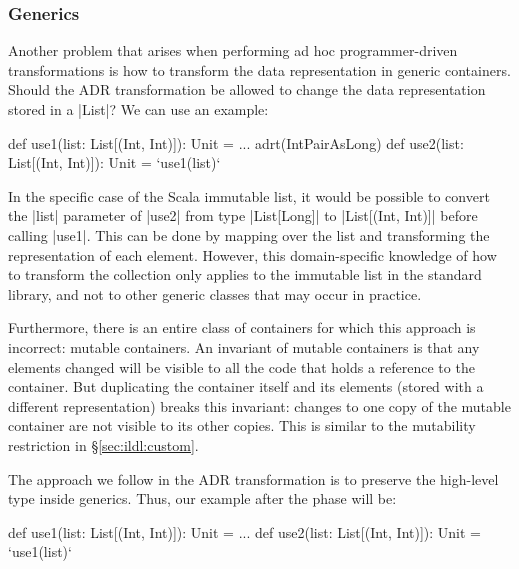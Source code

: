 \subsubsection{Generics}
\label{sec:ildl:language-generics}
Another problem that arises when performing ad hoc programmer-driven transformations is how to transform the data representation in generic containers. Should the ADR transformation be allowed to change the data representation stored in a |List|? We can use an example:

\begin{lstlisting-nobreak}
def use1(list: List[(Int, Int)]): Unit = ...
adrt(IntPairAsLong) {
  def use2(list: List[(Int, Int)]): Unit = `use1(list)`
}
\end{lstlisting-nobreak}

In the specific case of the Scala immutable list, it would be possible to convert the |list| parameter of |use2| from type |List[Long]| to |List[(Int, Int)]| before calling |use1|. This can be done by mapping over the list and transforming the representation of each element. However, this domain-specific knowledge of how to transform the collection only applies to the immutable list in the standard library, and not to other generic classes that may occur in practice.

Furthermore, there is an entire class of containers for which this approach is incorrect: mutable containers. An invariant of mutable containers is that any elements changed will be visible to all the code that holds a reference to the container. But duplicating the container itself and its elements (stored with a different representation) breaks this invariant: changes to one copy of the mutable container are not visible to its other copies. This is similar to the mutability restriction in \S\ref{sec:ildl:custom}.

The approach we follow in the ADR transformation is to preserve the high-level type inside generics. Thus, our example after the \commit{} phase will be:

\begin{lstlisting-nobreak}
def use1(list: List[(Int, Int)]): Unit = ...
def use2(list: List[(Int, Int)]): Unit = `use1(list)`
\end{lstlisting-nobreak}


